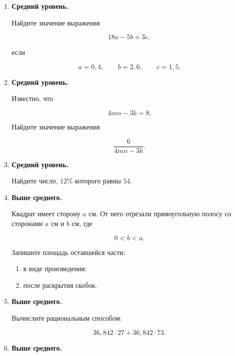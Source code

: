 \documentclass[a4paper,12pt]{article}
\begin{document}
\begin{enumerate}


\item
\textbf{Средний уровень.}

Найдите значение выражения

\[
18a-5b+3c,
\]

если

\[
a=0{,}4,
\qquad
b=2{,}6,
\qquad
c=1{,}5.
\]


\item
\textbf{Средний уровень.}

Известно, что

\[
4mn-3k=8.
\]

Найдите значение выражения

\[
\frac{6}{4mn-3k}.
\]


\item
\textbf{Средний уровень.}

Найдите число, $12\%$ которого равны $54$.


\item
\textbf{Выше среднего.}

Квадрат имеет сторону $a$ см.
От него отрезали прямоугольную полосу
со сторонами $a$ см и $b$ см, где

\[
0<b<a.
\]

Запишите площадь оставшейся части:

\begin{enumerate}

  \item
  в виде произведения;

  \item
  после раскрытия скобок.

\end{enumerate}


\item
\textbf{Выше среднего.}

Вычислите рациональным способом:

\[
36{,}842\cdot27
+
36{,}842\cdot73.
\]


\item
\textbf{Выше среднего.}


\end{enumerate}
\end{document}
